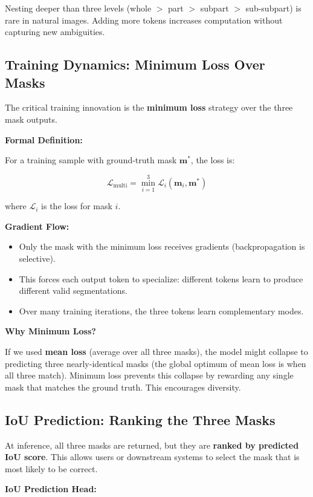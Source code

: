 Nesting deeper than three levels (whole $>$ part $>$ subpart $>$ sub-subpart) is rare in natural images. Adding more tokens increases computation without capturing new ambiguities.

\subsection{Training Dynamics: Minimum Loss Over Masks}

The critical training innovation is the \textbf{minimum loss} strategy over the three mask outputs.

\textbf{Formal Definition:}

For a training sample with ground-truth mask $\mathbf{m}^*$, the loss is:

\[ \mathcal{L}_{\text{multi}} = \min_{i=1}^{3} \mathcal{L}_i(\mathbf{m}_i, \mathbf{m}^*) \]

where $\mathcal{L}_i$ is the loss for mask $i$.

\textbf{Gradient Flow:}

\begin{itemize}
    \item Only the mask with the minimum loss receives gradients (backpropagation is selective).
    \item This forces each output token to specialize: different tokens learn to produce different valid segmentations.
    \item Over many training iterations, the three tokens learn complementary modes.
\end{itemize}

\textbf{Why Minimum Loss?}

If we used \textbf{mean loss} (average over all three masks), the model might collapse to predicting three nearly-identical masks (the global optimum of mean loss is when all three match). Minimum loss prevents this collapse by rewarding any single mask that matches the ground truth. This encourages diversity.

\subsection{IoU Prediction: Ranking the Three Masks}

At inference, all three masks are returned, but they are \textbf{ranked by predicted IoU score}. This allows users or downstream systems to select the mask that is most likely to be correct.

\textbf{IoU Prediction Head:}

